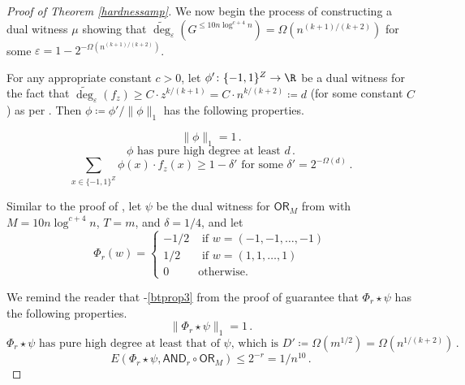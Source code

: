 \documentclass{toc}
\newcommand{\OR}{\mathsf{ OR}}
\newcommand{\bits}{\{-1,1\}}
\newcommand{\ls}{\star}
\newcommand{\eps}{\varepsilon}
\newcommand{\adeg}{\widetilde{\operatorname{deg}}}
\newcommand{\AND}{\mathsf{AND}}
\begin{document}
\begin{proof}[Proof of Theorem \ref{hardnessamp}]
	
	\medskip
	We now begin the process of constructing a dual witness $\mu$ showing that $\adeg_{\eps}(G^{\leq 10 n \log^{c + 4} n})=\Omega\left(n^{(k+1)/(k+2)}\right)$
	for some $\eps=1-2^{-\Omega\left(n^{(k+1)/(k+2)}\right)}$.
	
	For any appropriate constant $c > 0$, let $\phi' \colon \bits^Z \to \R$ be a dual witness for the fact that $\adeg_{\eps}(f_z) \geq C \cdot z^{k/(k+1)} = C \cdot n^{k/(k+2)}\coloneqq d$ (for some constant $C$) as per .
	Then $\phi \coloneqq  \phi'/\|\phi\|_1$ has the following properties. %
	
	\begin{equation}
	\label{phiprop1}
	\|\phi\|_1 =1\,.
	\end{equation}
	\begin{equation}
	\label{phiprop2}
	\phi \text{ has pure high degree at least } d\,.
	\end{equation}
	\begin{equation}
	\label{phiprop3}
	\sum_{x\in\bits^Z} \phi(x) \cdot f_z(x) \geq 1-\delta' \text{ for some } \delta'=2^{-\Omega(d)}\,.
	\end{equation}
	
	Similar to the proof of , let $\psi$ be the dual witness for $\OR_M$ from  with $M=10n\log^{c+4}n$, $T = m$, and $\delta=1/4$,
	and let 
	$$\Phi_r(w) = \begin{cases}
	-1/2 & \text{ if } w=(-1, -1, \dots, -1)\\
	1/2 & \text{ if } w= (1, 1, \dots, 1)\\
	0 & \text{otherwise}.
	\end{cases}$$
	
	We remind the reader %
	that -\eqref{btprop3} from the proof of  guarantee %
	 that $\Phi_r \ls \psi$ has
	the following properties.
	\begin{equation}  \label{btprop1repeat}
	\|\Phi_r \ls \psi\|_1=1\,.
	\end{equation}
	\begin{equation}  \label{btprop2repeat}
	\Phi_r \ls \psi \text{ has pure high degree at least that of } \psi \text{, which is } D'\coloneqq \Omega\left(m^{1/2}\right)=\Omega\left(n^{1/(k+2)}\right)\,.
	\end{equation}
	\begin{equation}  \label{btprop3repeat}
	E\left(\Phi_r \ls \psi, \AND_r \circ \OR_M\right) \leq 2^{-r}=1/n^{10}\,.
	\end{equation}


\end{proof}
\end{document}
